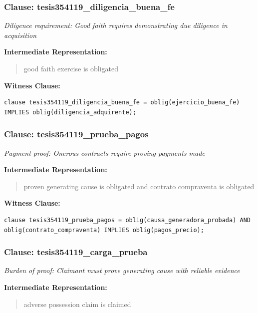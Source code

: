 \documentclass[11pt,a4paper]{article}
\begin{document}
\subsubsection{Clause: tesis354119\_diligencia\_buena\_fe}

\textit{Diligence requirement: Good faith requires demonstrating due diligence in acquisition}

\textbf{Intermediate Representation:}

\begin{quote}
good faith exercise is obligated
\end{quote}

\textbf{Witness Clause:}

\begin{lstlisting}[style=witnessstyle, language=Witness]
clause tesis354119_diligencia_buena_fe = oblig(ejercicio_buena_fe) IMPLIES oblig(diligencia_adquirente);
\end{lstlisting}

\subsubsection{Clause: tesis354119\_prueba\_pagos}

\textit{Payment proof: Onerous contracts require proving payments made}

\textbf{Intermediate Representation:}

\begin{quote}
proven generating cause is obligated and contrato compraventa is obligated
\end{quote}

\textbf{Witness Clause:}

\begin{lstlisting}[style=witnessstyle, language=Witness]
clause tesis354119_prueba_pagos = oblig(causa_generadora_probada) AND oblig(contrato_compraventa) IMPLIES oblig(pagos_precio);
\end{lstlisting}

\subsubsection{Clause: tesis354119\_carga\_prueba}

\textit{Burden of proof: Claimant must prove generating cause with reliable evidence}

\textbf{Intermediate Representation:}

\begin{quote}
adverse possession claim is claimed
\end{quote}
\end{document}
